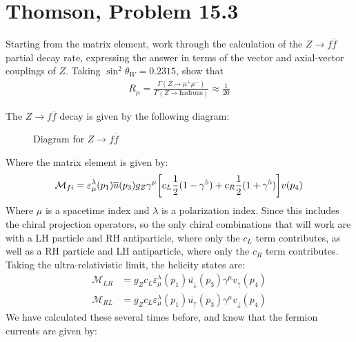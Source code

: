 \documentclass[12pt]{article}
\newcommand{\M}{\mathcal{M}}
\newcommand{\veps}{\varepsilon}
\begin{document}
\section{Thomson, Problem 15.3}
\begin{problem}
  Starting from the matrix element, work through the calculation of the $Z\to f\overline{f}$ partial decay rate, expressing the answer in terms of the vector and axial-vector couplings of $Z$. Taking $\sin^2\theta_W=0.2315$, show that
  \begin{align*}
    R_\mu=\frac{\Gamma(Z\to\mu^+\mu^-)}{\Gamma(Z\to\text{hadrons})}
    \approx\frac1{20}
  \end{align*}
\end{problem}
The $Z\to f\overline{f}$ decay is given by the following diagram:
\begin{figure}[H]
  \centering
  \caption{Diagram for $Z\to f\overline{f}$}\label{fig:p2}
\end{figure}
Where the matrix element is given by:
\begin{align*}
  \M_{fi}=\veps_\mu^\lambda(p_1)\overline{u}(p_3)
  g_Z\gamma^\mu\qty[c_L\frac12(1-\gamma^5)+c_R\frac12(1+\gamma^5)]
  v(p_4)
\end{align*}
Where $\mu$ is a spacetime index and $\lambda$ is a polarization index. Since this includes the chiral projection operators, so the only chiral combinations that will work are with a LH particle and RH antiparticle, where only the $c_L$ term contributes, as well as a RH particle and LH antiparticle, where only the $c_R$ term contributes. Taking the ultra-relativistic limit, the helicity states are:
\begin{align*}
  \M_{LR}&=g_Z c_L\veps_\mu^\lambda(p_1)\overline{u_\downarrow}(p_3)
  \gamma^\mu v_\uparrow(p_4)\\
  \M_{RL}&=g_Z c_L\veps_\mu^\lambda(p_1)\overline{u_\uparrow}(p_3)
  \gamma^\mu v_\downarrow(p_4)
\end{align*}
We have calculated these several times before, and know that the fermion currents are given by:
\end{document}
